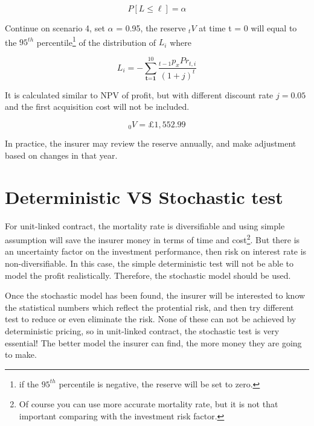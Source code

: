 \documentclass{report}
\begin{document}
\[
P[L\leq \ell] = \alpha
\]

Continue on scenario 4, set $\alpha$ = 0.95, the reserve $_tV$ at time t = 0 will equal to the $95^{th}$ percentile\footnote{if the $95^{th}$ percentile is negative, the reserve will be set to zero.} of the distribution of $L_i$ where

\[
L_i = - \sum_{\textbf{t=1}}^{10}\frac{_{t-1}p_x Pr_{t,i}}{(1+j)^t}
\]

It is calculated similar to NPV of profit, but with different discount rate $j = 0.05$ and the first acquisition cost will not be included.

\[
_0V = \pounds 1,552.99
\]


In practice, the insurer may review the reserve annually, and make adjustment based on changes in that year. 



\section{Deterministic VS Stochastic test}

For unit-linked contract, the mortality rate is diversifiable and using simple assumption will save the insurer money in terms of time and cost\footnote{Of course you can use more accurate mortality rate, but it is not that important comparing with the investment risk factor.}. But there is an uncertainty factor on the investment performance, then risk on interest rate is non-diversifiable. In this case, the simple deterministic test will not be able to model the profit realistically. Therefore, the stochastic model should be used. 

Once the stochastic model has been found, the insurer will be interested to know the statistical numbers which reflect the protential risk, and then try different test to reduce or even eliminate the risk. None of these can not be achieved by deterministic pricing, so in unit-linked contract, the stochastic test is very essential! The better model the insurer can find, the more money they are going to make.
\end{document}
